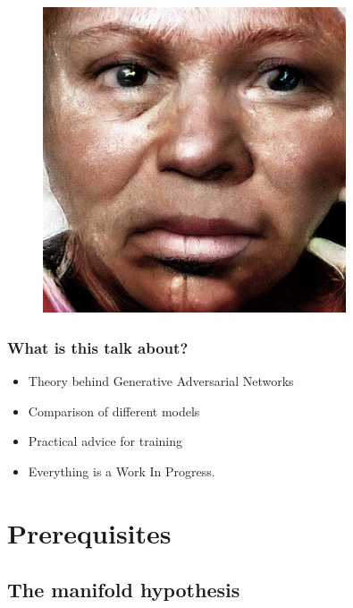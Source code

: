 \documentclass{Bredelebeamer}
\begin{document}
\begin{frame}
\begin{figure}[h!]
	\centering
	\includegraphics[width=0.8\textwidth]{4k_black_woman.jpg}
\end{figure}
\end{frame}
\begin{frame}
\frametitle{What is this talk about?}
\begin{itemize}
	\item Theory behind Generative Adversarial Networks
	\item Comparison of different models
	\item Practical advice for training
	\item Everything is a Work In Progress.
\end{itemize}

\end{frame}


\section{Prerequisites}
\subsection{The manifold hypothesis}
\end{document}

